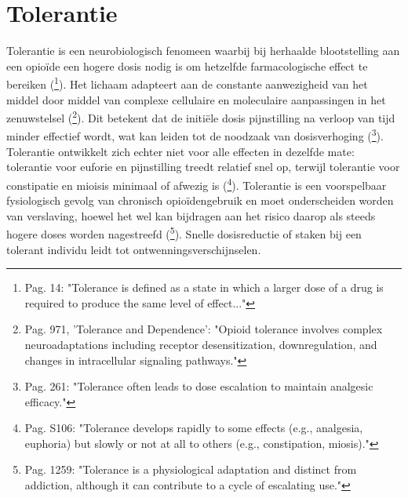 \documentclass[11pt, a4paper]{report} %
\begin{document}
\section{Tolerantie}
Tolerantie is een neurobiologisch fenomeen waarbij bij herhaalde blootstelling aan een opioïde een hogere dosis nodig is om hetzelfde farmacologische effect te bereiken (\cite{Kosten2002NeurobiologyDependence}\footnote{Pag. 14: "Tolerance is defined as a state in which a larger dose of a drug is required to produce the same level of effect..."}). Het lichaam adapteert aan de constante aanwezigheid van het middel door middel van complexe cellulaire en moleculaire aanpassingen in het zenuwstelsel (\cite{Shang2020MolecularBasis}\footnote{Pag. 971, 'Tolerance and Dependence': "Opioid tolerance involves complex neuroadaptations including receptor desensitization, downregulation, and changes in intracellular signaling pathways."}). Dit betekent dat de initiële dosis pijnstilling na verloop van tijd minder effectief wordt, wat kan leiden tot de noodzaak van dosisverhoging (\cite{Cicero2017Review}\footnote{Pag. 261: "Tolerance often leads to dose escalation to maintain analgesic efficacy."}). Tolerantie ontwikkelt zich echter niet voor alle effecten in dezelfde mate: tolerantie voor euforie en pijnstilling treedt relatief snel op, terwijl tolerantie voor constipatie en mioisis minimaal of afwezig is (\cite{Benyamin2008OpioidComplications}\footnote{Pag. S106: "Tolerance develops rapidly to some effects (e.g., analgesia, euphoria) but slowly or not at all to others (e.g., constipation, miosis)."}). Tolerantie is een voorspelbaar fysiologisch gevolg van chronisch opioïdengebruik en moet onderscheiden worden van verslaving, hoewel het wel kan bijdragen aan het risico daarop als steeds hogere doses worden nagestreefd (\cite{Volkow2016OpioidAbuseChronicPain}\footnote{Pag. 1259: "Tolerance is a physiological adaptation and distinct from addiction, although it can contribute to a cycle of escalating use."}). Snelle dosisreductie of staken bij een tolerant individu leidt tot ontwenningsverschijnselen.
\end{document}

